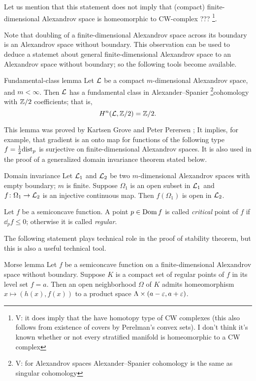 Let us mention that this statement does not imply that (compact) finite-dimensional Alexandrov space is homeomorphic to CW-complex ???
\footnote{\red V: it does imply that the have homotopy type of CW complexes (this also follows from existence of covers by Perelman's convex sets). I don't think it's known whether or not every stratified manifold is homeomorphic to a CW complex}.

Note that doubling of a finite-dimensional Alexandrov space across its boundary is an Alexandrov space without boundary.
This observation can be used to deduce a statemet about general finite-dimensional Alexandrov space to an Alexandrov space without boundary;
so the following tools become available.

\begin{thm}{Fundamental-class lemma}\label{lem:fund-class}
Let $\mathcal{L}$ be a compact $m$-dimensional Alexandrov space, and $m<\infty$.
Then $\mathcal{L}$ has a fundamental class in Alexander--Spanier \footnote{\red V: for Alexandrov spaces  Alexander--Spanier  cohomology is the same as singular cohomology }cohomology with $\mathbb{Z}/2$ coefficients; 
that is, 
\[H^n(\mathcal{L},\mathbb{Z}/2)=\mathbb{Z}/2.\]

\end{thm}

This lemma was proved by Kartsen Grove and Peter Perersen \cite{grove-petersen};
It implies, for example, that gradient is an onto map  for functions of the following type $f=\tfrac12\mathrm{dist}_p$ is surjective on finite-dimensional Alexandrov spaces.
It is also used in the proof of a generalized domain invariance theorem stated below. 

\begin{thm}{Domain invariance}\label{thm-inv-domain}
Let $\mathcal{L}_1$ and $\mathcal{L}_2$ be two $m$-dimensional Alexandrov spaces with empty boundary; $m$ is finite.
Suppose $\Omega_1$ is an open subset in $\mathcal{L}_1$ and $f\colon\Omega_1\to \mathcal{L}_2$ is an injective continuous map.
Then $f(\Omega_1)$ is open in $\mathcal{L}_2$.
\end{thm}

Let $f$ be a semiconcave function.
A point $p\in \mathop{\rm Dom}\nolimits f$ is called \emph{critical} point of $f$ if $\dd_pf\le 0$; 
otherwise it is called \emph{regular}.

The following statement plays technical role in the proof of stability theorem,
but this is also a useful technical tool.

\begin{thm}{Morse lemma}
Let $f$ be a semiconcave function on a finite-dimensional Alexandrov space without boundary.
Suppose $K$ is a compact set of regular points of $f$ in its level set $f=a$.
Then an open neighborhood $\Omega$ of $K$ admits homeomorphism $x\mapsto (h(x),f(x))$ to a product space $\Lambda\times (a-\varepsilon,a+\varepsilon)$.
\end{thm}

